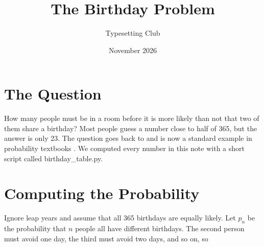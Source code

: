 \documentclass{article}
\title{The Birthday Problem}
\author{Typesetting Club}
\date{November 2026}
\begin{document}
\maketitle

\section{The Question}
How many people must be in a room before it is more likely than not
that two of them share a birthday? Most people guess a number close to
half of 365, but the answer is only 23. The question goes back to
\textcite{mises1939} and is now a standard example in probability
textbooks \parencite{feller1968}. We computed every number in this note
with a short script called birthday_table.py.

\section{Computing the Probability}
Ignore leap years and assume that all 365 birthdays are equally likely.
Let $p_n$ be the probability that $n$ people all have different
birthdays. The second person must avoid one day, the third must avoid
two days, and so on, so
\end{document}
